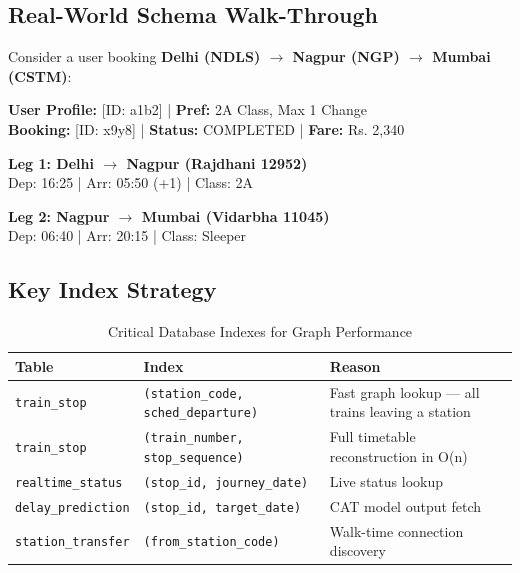 \documentclass[12pt,a4paper]{report}
\begin{document}
\subsection*{Real-World Schema Walk-Through}

Consider a user booking \textbf{Delhi (NDLS) $\to$ Nagpur (NGP) $\to$ Mumbai (CSTM)}:

\begin{tcolorbox}[enhanced, colback=codebg, colframe=primary, title=Database Trace: Delhi--Nagpur--Mumbai Journey, coltitle=white, fonttitle=\bfseries]
\small\color{codetext}
\textbf{User Profile:} [ID: a1b2] | \textbf{Pref:} 2A Class, Max 1 Change \\
\textbf{Booking:} [ID: x9y8] | \textbf{Status:} COMPLETED | \textbf{Fare:} Rs. 2,340

\tcbline
\textbf{Leg 1: Delhi $\to$ Nagpur (Rajdhani 12952)} \\
\faTrain \quad Dep: 16:25 | Arr: 05:50 (+1) | Class: 2A

\tcbline
\textbf{Leg 2: Nagpur $\to$ Mumbai (Vidarbha 11045)} \\
\faTrain \quad Dep: 06:40 | Arr: 20:15 | Class: Sleeper
\end{tcolorbox}

\subsection*{Key Index Strategy}

\begin{table}[h!]
\centering
\caption{Critical Database Indexes for Graph Performance}
\begin{tabularx}{\textwidth}{llX}
\toprule
\textbf{Table} & \textbf{Index} & \textbf{Reason} \\
\midrule
\texttt{train\_stop} & \texttt{(station\_code, sched\_departure)} & Fast graph lookup --- all trains leaving a station \\
\texttt{train\_stop} & \texttt{(train\_number, stop\_sequence)} & Full timetable reconstruction in O(n) \\
\texttt{realtime\_status} & \texttt{(stop\_id, journey\_date)} & Live status lookup \\
\texttt{delay\_prediction} & \texttt{(stop\_id, target\_date)} & CAT model output fetch \\
\texttt{station\_transfer} & \texttt{(from\_station\_code)} & Walk-time connection discovery \\
\bottomrule
\end{tabularx}
\end{table}
\end{document}
